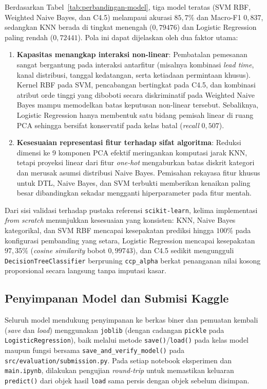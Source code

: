 Berdasarkan Tabel~\ref{tab:perbandingan-model}, tiga model teratas (SVM RBF, Weighted Naive Bayes,
dan C4.5) melampaui akurasi $85{,}7\%$ dan Macro-F1 $0{,}837$, sedangkan KNN berada di tingkat menengah
($0{,}79476$) dan Logistic Regression paling rendah ($0{,}72441$). Pola ini dapat dijelaskan oleh dua faktor utama:
\begin{enumerate}
  \item \textbf{Kapasitas menangkap interaksi non-linear}: Pembatalan pemesanan sangat bergantung pada
        interaksi antarfitur (misalnya kombinasi \textit{lead time}, kanal distribusi, tanggal kedatangan,
        serta ketiadaan permintaan khusus). Kernel RBF pada SVM, pencabangan bertingkat pada C4.5, dan
        kombinasi atribut orde tinggi yang diboboti secara diskriminatif pada Weighted Naive Bayes mampu
        memodelkan batas keputusan non-linear tersebut. Sebaliknya, Logistic Regression hanya membentuk satu
        bidang pemisah linear di ruang PCA sehingga bersifat konservatif pada kelas batal (\textit{recall} $0{,}507$).
  \item \textbf{Kesesuaian representasi fitur terhadap sifat algoritma}: Reduksi dimensi ke 9 komponen PCA
        efektif meringankan komputasi jarak KNN, tetapi proyeksi linear dari fitur \textit{one-hot}
        mengaburkan batas diskrit kategori dan merusak asumsi distribusi Naive Bayes. Pemisahan
        rekayasa fitur khusus untuk DTL, Naive Bayes, dan SVM terbukti memberikan kenaikan paling besar
        dibandingkan sekadar mengganti hiperparameter pada fitur mentah.
\end{enumerate}

Dari sisi validasi terhadap pustaka referensi \texttt{scikit-learn}, kelima implementasi
\textit{from scratch} menunjukkan kesesuaian yang konsisten: KNN, Naive Bayes kategorikal, dan SVM RBF
mencapai kesepakatan prediksi hingga $100\%$ pada konfigurasi pembanding yang setara, Logistic Regression
mencapai kesepakatan $97{,}35\%$ (\textit{cosine similarity} bobot $0{,}99743$), dan C4.5 sedikit mengungguli
\texttt{DecisionTreeClassifier} berpruning \texttt{ccp\_alpha} berkat penanganan nilai kosong proporsional
secara langsung tanpa imputasi kasar.

\subsection{Penyimpanan Model dan Submisi Kaggle}

Seluruh model mendukung penyimpanan ke berkas biner dan pemuatan kembali (\textit{save} dan \textit{load})
menggunakan \texttt{joblib} (dengan cadangan \texttt{pickle} pada \texttt{LogisticRegression}), baik melalui
metode \texttt{save()}/\texttt{load()} pada kelas model maupun fungsi bersama \texttt{save\_and\_verify\_model()}
pada \texttt{src/evaluation/submission.py}. Pada setiap notebook eksperimen dan \texttt{main.ipynb},
dilakukan pengujian \textit{round-trip} untuk memastikan keluaran \texttt{predict()} dari objek hasil
\texttt{load} sama persis dengan objek sebelum disimpan.

